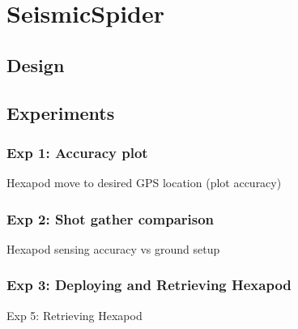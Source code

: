 \section{SeismicSpider}\label{sec:SeismicSpider}

\subsection{Design}

\subsection{Experiments}
\subsubsection{Exp 1: Accuracy plot}
Hexapod move to desired GPS location  (plot accuracy)\\
\subsubsection{Exp 2: Shot gather comparison}
Hexapod sensing accuracy vs ground setup\\
\subsubsection{Exp 3: Deploying and Retrieving Hexapod}
Exp 5: Retrieving Hexapod\\